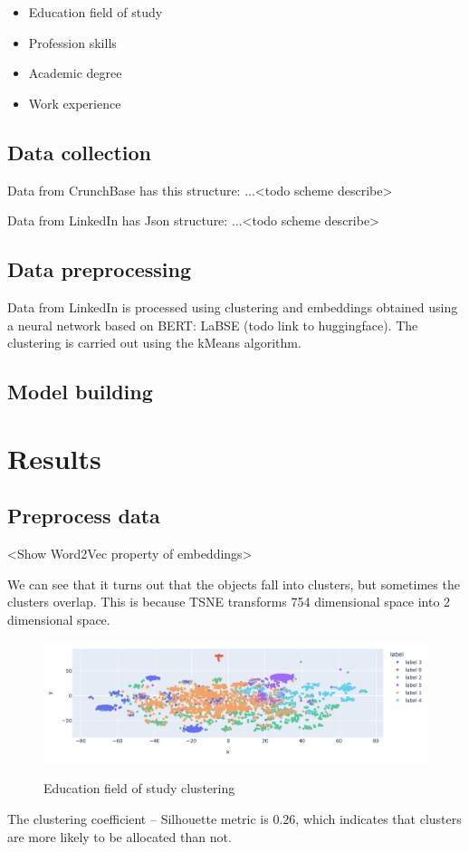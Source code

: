 \documentclass[12pt]{article}
\theoremstyle{plain}
\theoremstyle{definition}
\begin{document}
\begin{itemize}
    \item Education field of study
    \item Profession skills
    \item Academic degree
    \item Work experience
\end{itemize}

\subsection{Data collection}

Data from CrunchBase has this structure: ...<todo scheme describe>

Data from LinkedIn has Json structure: ...<todo scheme describe>


\subsection{Data preprocessing}

Data from LinkedIn is processed using clustering and embeddings obtained using a neural network based on BERT: LaBSE (todo link to huggingface). The clustering is carried out using the kMeans algorithm.

\subsection{Model building}

\section{Results}

\subsection{Preprocess data}

<Show Word2Vec property of embeddings>

We can see that it turns out that the objects fall into clusters, but sometimes the clusters overlap. This is because TSNE transforms 754 dimensional space into 2 dimensional space. 

\begin{figure}[!h]
  \centering
  \includegraphics[width=160mm]{figures/paper/kMeans-9_03.png}
  \label{fig:gd}
  \caption{Education field of study clustering}
\end{figure}

The clustering coefficient -- Silhouette  metric is $0.26$, which indicates that clusters are more likely to be allocated than not.
\end{document}
